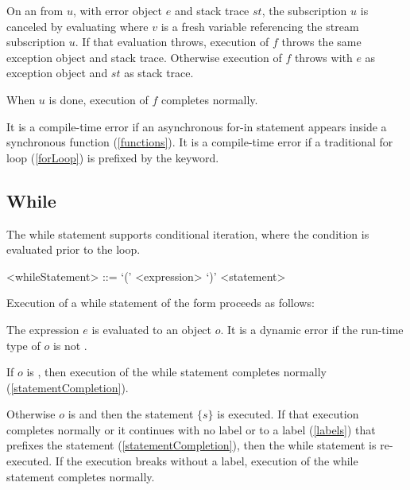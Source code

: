 \documentclass[makeidx]{article}
\begin{document}
{\LMHash{}%
On an  from $u$,
with error object $e$ and stack trace $st$,
the subscription $u$ is canceled by evaluating 
where $v$ is a fresh variable referencing the stream subscription $u$.
If that evaluation throws,
execution of $f$ throws the same exception object and stack trace.
Otherwise execution of $f$ throws with $e$ as exception object and $st$ as stack trace.

\LMHash{}%
When $u$ is done, execution of $f$ completes normally.

\LMHash{}%
It is a compile-time error if an asynchronous for-in statement appears inside a synchronous function (\ref{functions}).
It is a compile-time error if a traditional for loop (\ref{forLoop}) is prefixed by the \AWAIT{} keyword.



\subsection{While}

\LMHash{}%
The while statement supports conditional iteration, where the condition is evaluated prior to the loop.

\begin{grammar}
<whileStatement> ::= \WHILE{} `(' <expression> `)' <statement>
\end{grammar}

\LMHash{}%
Execution of a while statement of the form  proceeds as follows:

\LMHash{}%
The expression $e$ is evaluated to an object $o$.
It is a dynamic error if the run-time type of $o$ is not .

\LMHash{}%
If $o$ is \FALSE{}, then execution of the while statement completes normally (\ref{statementCompletion}).

\LMHash{}%
Otherwise $o$ is \TRUE{} and then the statement $\{s\}$ is executed.
If that execution completes normally or it continues with no label or to a label (\ref{labels}) that prefixes the \WHILE{} statement (\ref{statementCompletion}), then the while statement is re-executed.
If the execution breaks without a label, execution of the while statement completes normally.

}
\end{document}
